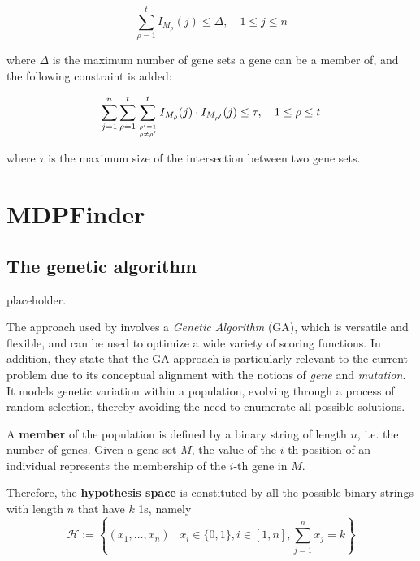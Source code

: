 \begin{equation}
    \sum_{\rho = 1}^t {I_{M_\rho}(j) \le \Delta}, \quad 1 \le j \le n
\end{equation}

where $\Delta$ is the maximum number of gene sets a gene can be a member of, and the following constraint is added:

\begin{equation}
    \sum_{j = 1}^n {\sum_{\rho = 1}^t \sum_{\rho' = 1 \atop \rho \neq \rho'}^t {{I_{M_\rho} (j) \cdot I_{M_{\rho'}} (j)}}} \le \tau, \quad 1 \le \rho \le t
\end{equation}

where $\tau$ is the maximum size of the intersection between two gene sets.

\section{MDPFinder}

\subsection{The genetic algorithm}

placeholder. 

The approach used by \textcite{mdpfinder} involves a \textit{Genetic Algorithm} (GA), which is versatile and flexible, and can be used to optimize a wide variety of scoring functions. In addition, they state that the GA approach is particularly relevant to the current problem due to its conceptual alignment with the notions of \textit{gene} and \textit{mutation}. It models genetic variation within a population, evolving through a process of random selection, thereby avoiding the need to enumerate all possible solutions.

\begin{definition}
    A \textbf{member} of the population is defined by a binary string of length $n$, i.e. the number of genes. Given a gene set $M$, the value of the $i$-th position of an individual represents the membership of the $i$-th gene in $M$.

    Therefore, the \textbf{hypothesis space} is constituted by all the possible binary strings with length $n$ that have $k$ 1s, namely $$\mathcal H := \left\{(x_1, \ldots, x_n) \mid x_i \in \{0, 1\}, i \in [1, n], \sum_{j = 1}^n {x_j} = k \right\}$$
\end{definition}

